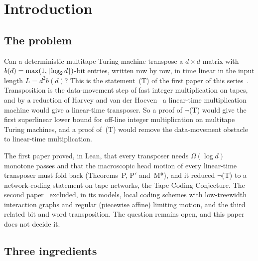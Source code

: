 \section{Introduction}\label{sec:intro}

\subsection{The problem}

Can a deterministic multitape Turing machine transpose a $d\times d$ matrix with $b(d)=\max(1,\lceil \log_2 d \rceil)$-bit entries, written row
by row, in time linear in the input length $L=d^2b(d)$? This is the statement~(T) of the first paper of this
series~\cite{FirstPaper2026}. Transposition is the data-movement step of fast integer multiplication on tapes, and by a
reduction of Harvey and van der Hoeven~\cite[Cor.~6.9]{HvdH2025} a linear-time multiplication machine would give a
linear-time transposer. So a proof of $\neg$(T) would give the first superlinear lower bound for off-line integer
multiplication on multitape Turing machines, and a proof of~(T) would remove the data-movement obstacle to linear-time
multiplication.

The first paper proved, in Lean, that every transposer needs $\Omega(\log d)$ monotone passes and that the macroscopic
head motion of every linear-time transposer must fold back (Theorems~P, P$'$ and~M*), and it reduced $\neg$(T) to a network-coding statement on tape networks,
the Tape Coding Conjecture. The second paper~\cite{SecondPaper2026} excluded, in its models, local coding schemes with
low-treewidth interaction graphs and regular (piecewise affine) limiting motion, and the third~\cite{ThirdPaper2026} related bit and word
transposition. The question remains open, and this paper does not decide it.

\subsection{Three ingredients}


